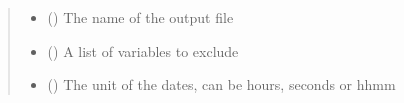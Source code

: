 \documentclass[a4paper,10pt,english]{sphinxmanual}
\begin{document}
\begin{fulllineitems}
\begin{fulllineitems}
\begin{quote}
\begin{description}
\begin{itemize}
\item {} 
 () \textendash{} The name of the output file

\item {} 
 (\sphinxstyleliteralemphasis{, }) \textendash{} A list of variables to exclude

\item {} 
 (\sphinxstyleliteralemphasis{, }) \textendash{} The unit of the dates, can be hours, seconds or hhmm

\end{itemize}

\end{description}\end{quote}

\end{fulllineitems}


\end{fulllineitems}

\end{document}
